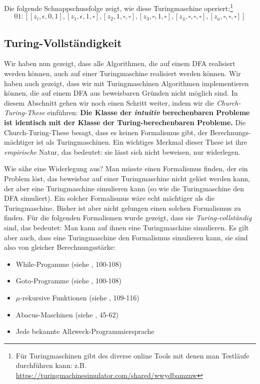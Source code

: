 Die folgende Schnappschussfolge zeigt, wie diese Turingmaschine operiert:\footnote{
    Für Turingmaschinen gibt des diverse online Tools mit denen man Testläufe durchführen kann:
    z.B. \url{https://turingmachinesimulator.com/shared/wwydbamznw}
}
\[
    01: [[z_i, \epsilon, 0, 1],
         [z_1, \epsilon, 1, \square],
         [z_2, 1, \square, \square],
         [z_3, \square, 1, \square],
         [z_4, \square, \square, \square],
         [z_a, \square, \square, \square]]
\]


\subsection{Turing-Vollständigkeit}\label{turingVollstaendigkeit}

Wir haben nun gezeigt,
dass alle Algorithmen,
die auf einem DFA realisiert werden können,
auch auf einer Turingmaschine realisiert werden können.
Wir haben auch gezeigt,
dass wir mit Turingmaschinen Algorithmen implementieren können,
die auf einem DFA aus beweisbaren Gründen nicht möglich sind.
In diesem Abschnitt gehen wir noch einen Schritt weiter,
indem wir die \emph{Church-Turing-These} einführen:
\textbf{Die Klasse der \emph{intuitiv} berechenbaren Probleme
ist identisch mit der Klasse der Turing-berechenbaren Probleme.}
Die Church-Turing-These besagt,
dass es keinen Formalismus gibt,
der Berechnungs-mächtiger ist als Turingmaschinen.
Ein wichtiges Merkmal dieser These ist ihre \emph{empirische} Natur,
das bedeutet: sie lässt sich nicht beweisen, nur widerlegen.

Wie sähe eine Widerlegung aus?
Man müsste einen Formalismus finden,
der ein Problem löst,
das beweisbar auf einer Turingmaschine nicht gelöst werden kann,
der aber eine Turingmaschine simulieren kann (so wie die Turingmaschine den DFA simuliert).
Ein solcher Formalismus wäre echt mächtiger als die Turingmaschine.
Bisher ist aber nicht gelungen einen solchen Formalismus zu finden.
Für die folgenden Formalismen wurde gezeigt,
dass sie \emph{Turing-vollständig} sind,
das bedeutet:
Man kann auf ihnen eine Turingmaschine simulieren.
Es gilt aber auch,
dass eine Turingmaschine den Formalismus simulieren kann,
sie sind also von gleicher Berechnungsstärke:
\begin{itemize}
    \item While-Progamme (siehe \cite{schoening}, 100-108)
    \item Goto-Programme (siehe \cite{schoening}, 100-108)
    \item $\mu$-rekursive Funktionen (siehe \cite{schoening}, 109-116)
    \item Abacus-Maschinen (siehe \cite{cal}, 45-62)
    \item Jede bekannte Allzweck-Programmiersprache
\end{itemize}


